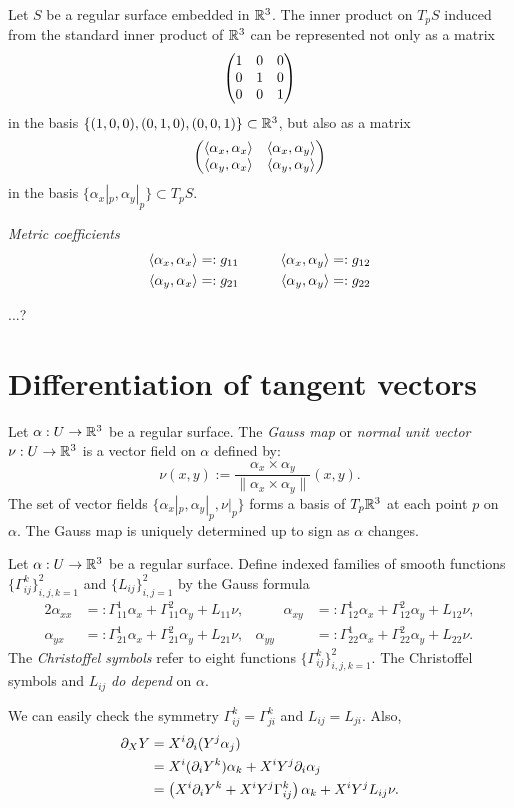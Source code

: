 \documentclass{../note}
\def\a{\alpha}
\begin{document}
\begin{prb}
Let $S$ be a regular surface embedded in $\mathbb{R}^3$.
The inner product on $T_pS$ induced from the standard inner product of $\mathbb{R}^3$ can be represented not only as a matrix
\[\begin{pmatrix}1&0&0\\0&1&0\\0&0&1\end{pmatrix}\]
in the basis $\{(1,0,0),(0,1,0),(0,0,1)\}\subset\mathbb{R}^3$, but also as a matrix
\[\mat{\<\a_x,\a_x\>&\<\a_x,\a_y\>\\\<\a_y,\a_x\>&\<\a_y,\a_y\>}\]
in the basis $\{\a_x|_p,\a_y|_p\}\subset T_pS$.

\begin{defn}
\emph{Metric coefficients}
\begin{alignat*}{2}
\<\a_x,\a_x\>&=:g_{11}&\qquad
\<\a_x,\a_y\>&=:g_{12}\\
\<\a_y,\a_x\>&=:g_{21}&
\<\a_y,\a_y\>&=:g_{22}
\end{alignat*}
\end{defn}

\begin{thm}
...?
\end{thm}




\section{Differentiation of tangent vectors}

\begin{defn}
Let $\a:U\to\R^3$ be a regular surface.
The \emph{Gauss map} or \emph{normal unit vector} $\nu:U\to\mathbb{R}^3$ is a vector field on $\a$ defined by:
\[\nu(x,y):=\frac{\a_x\times \a_y}{\|\a_x\times \a_y\|}(x,y).\]
The set of vector fields $\{\a_x|_p,\a_y|_p,\nu|_p\}$ forms a basis of $T_p\mathbb{R}^3$ at each point $p$ on $\a$.
The Gauss map is uniquely determined up to sign as $\a$ changes.
\end{defn}

\begin{defn}
Let $\a:U\to\R^3$ be a regular surface.
Define indexed families of smooth functions $\{\Gamma_{ij}^k\}_{i,j,k=1}^2$ and $\{L_{ij}\}_{i,j=1}^2$ by the Gauss formula
\begin{alignat*}{2}
\a_{xx}&=:\Gamma_{11}^1\a_x+\Gamma_{11}^2\a_y+L_{11}\nu,&\qquad
\a_{xy}&=:\Gamma_{12}^1\a_x+\Gamma_{12}^2\a_y+L_{12}\nu,\\
\a_{yx}&=:\Gamma_{21}^1\a_x+\Gamma_{21}^2\a_y+L_{21}\nu,&
\a_{yy}&=:\Gamma_{22}^1\a_x+\Gamma_{22}^2\a_y+L_{22}\nu.
\end{alignat*}
The \emph{Christoffel symbols} refer to eight functions $\{\Gamma_{ij}^k\}_{i,j,k=1}^2$.
The Christoffel symbols and $L_{ij}$ \emph{do depend} on $\a$.
\end{defn}
We can easily check the symmetry $\Gamma_{ij}^k=\Gamma_{ji}^k$ and $L_{ij}=L_{ji}$.
Also,
\begin{align*}
\pd_XY
&=X^i\pd_i(Y^j\a_j)\\
&=X^i(\pd_iY^k)\a_k+X^iY^j\pd_i\a_j\\
&=\left(X^i\pd_iY^k+X^iY^j\Gamma_{ij}^k\right)\a_k+X^iY^jL_{ij}\nu.
\end{align*}


\end{prb}
\end{document}
